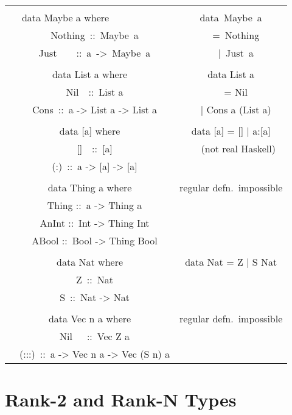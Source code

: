 \documentclass{refcard}
\begin{document}
\begin{ldesc}
	\li[enabling] 
\end{ldesc}\\[1ex]
\begin{tabular}{CC}
\\
data Maybe a where~~~~~~~~~~ & data~Maybe~a \\
~~Nothing~::~Maybe~a         & ~~=~Nothing  \\
~~Just~~~~::~a~->~Maybe~a    & ~~|~Just~a   \\
\\
data List a where                & data List a         \\
~~Nil~~::~List a                 & ~~= Nil             \\
~~Cons~::~a -> List a -> List a  & ~~| Cons a (List a) \\
\\
data [a] where                   & data [a] = [] | a:[a] \\
~~[]~~::~[a]                     & ~~\textnormal{\footnotesize ~(not real Haskell)} \\
~~(:)~::~a -> [a] -> [a]         & \\
\\
data Thing a where            & \textnormal{regular defn.~impossible} \\
~~Thing ::~a -> Thing a       & \\
~~AnInt ::~Int -> Thing Int   & \\
~~ABool ::~Bool -> Thing Bool & \\
\\
data Nat where      & data Nat = Z | S Nat \\
~~Z~::~Nat & \\
~~S~::~Nat -> Nat & \\
\\
data Vec n a where & \textnormal{regular defn.~impossible} \\
~~Nil~~~::~Vec Z a & \\
~~(:::)~::~a -> Vec n a -> Vec (S n) a \hspace{-8ex} & \\
\end{tabular}


\section{Rank-2 and Rank-N Types
  \hfill{}}
\end{document}
